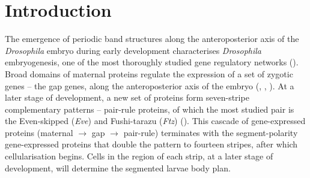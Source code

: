 \documentclass[final,authoryear, 5p, times]{elsarticle}
\begin{document}
\section{Introduction}
\label{sec:intro}

The emergence of periodic band structures along the anteroposterior axis of the \textit{Drosophila} embryo during early development characterises \textit{Drosophila} embryogenesis, one of the most thoroughly studied gene regulatory networks (\cite{Nuss}). Broad domains of maternal proteins regulate the expression of a set of zygotic genes -- the gap genes, along the anteroposterior axis of the embryo (\cite{akam}, \cite{Riv}, \cite{aldi2006}). At a later stage of development, a new set of proteins form seven-stripe complementary patterns -- pair-rule proteins,  of which the most studied pair is the  Even-skipped  (\textit{Eve}) and  Fushi-tarazu  (\textit{Ftz}) (\cite{Frash_correct}).
This cascade of gene-expressed proteins (maternal $\to$ gap $\to$ pair-rule) terminates with the segment-polarity gene-expressed proteins that double the pattern to fourteen stripes, after which cellularisation begins. Cells in the region of each strip, at a later stage of development, will determine the segmented larvae body plan.
\end{document}
